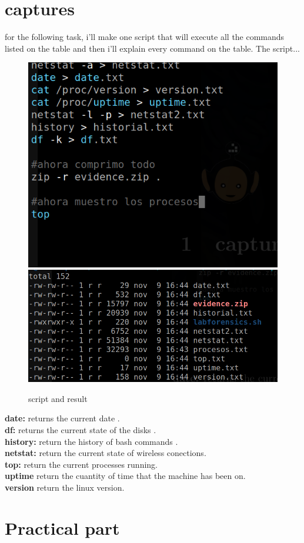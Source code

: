 \documentclass[10pt,a4paper]{article} %
\begin{document}
    \newpage
    \section{captures}
    for the following task, i'll make one script that will execute all the
    commands listed on the table and then i'll explain every command on the
    table.
    The script...
    \begin{figure}[h!]
        \centering
        \includegraphics[width=0.5\linewidth]{script.png}
        \includegraphics[width=0.5\linewidth]{result.png}
        \caption{script and result}
        \label{script}
    \end{figure}

    \textbf{date:} returns the current date .
    \\
    \textbf{df:} returns the current state of the disks .
    \\
    \textbf{history:} return the history of bash commands .
    \\
    \textbf{netstat:} return the current state of wireless conections.
    \\
    \textbf{top:} return the current processes running.
    \\
    \textbf{uptime}  return the cuantity of time that the machine has been on.
    \\
    \textbf{version} return the linux version.

    \newpage
    \section{Practical part}
\end{document}
